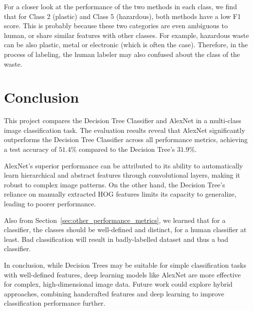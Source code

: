 \documentclass[a4paper,12pt]{article}
\begin{document}
For a closer look at the performance of the two methods in each class, we find that for Class 2 (plastic) and Class 5 (hazardous), both methods have a low F1 score. This is probably because these two categories are even ambiguous to human, or share similar features with other classes. For example, hazardous waste can be also plastic, metal or electronic (which is often the case). Therefore, in the process of labeling, the human labeler may also confused about the class of the waste.

\section{Conclusion}

This project compares the Decision Tree Classifier and AlexNet in a multi-class image classification task. The evaluation results reveal that AlexNet significantly outperforms the Decision Tree Classifier across all performance metrics, achieving a test accuracy of $51.4\%$ compared to the Decision Tree’s $31.9\%$.

AlexNet’s superior performance can be attributed to its ability to automatically learn hierarchical and abstract features through convolutional layers, making it robust to complex image patterns. On the other hand, the Decision Tree’s reliance on manually extracted HOG features limits its capacity to generalize, leading to poorer performance.

Also from Section~\ref{sec:other_performance_metrics}, we learned that for a classifier, the classes should be well-defined and distinct, for a human classifier at least. Bad classification will result in badly-labelled dataset and thus a bad classifier. 

In conclusion, while Decision Trees may be suitable for simple classification tasks with well-defined features, deep learning models like AlexNet are more effective for complex, high-dimensional image data. Future work could explore hybrid approaches, combining handcrafted features and deep learning to improve classification performance further.

\newpage
\appendix
\end{document}
